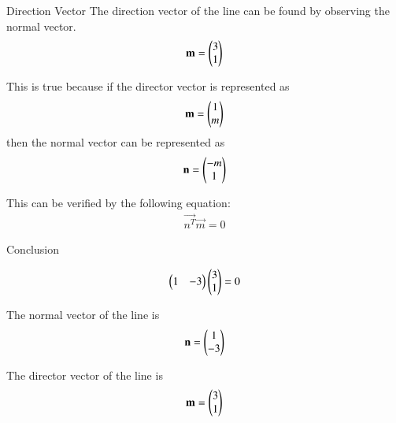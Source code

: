 \documentclass{beamer}
\begin{document}
\begin{frame}{Direction Vector}
The direction vector of the line can be found by observing the normal vector.
\begin{align}
\mathbf{m} = \begin{pmatrix}3 \\ 1\end{pmatrix}
\end{align}

This is true because if the director vector is represented as 
\begin{align}
\mathbf{m}  = \begin{pmatrix}1 \\ m\end{pmatrix}    
\end{align}
then the normal vector can be represented as 
\begin{align}
\mathbf{n} = \begin{pmatrix}-m \\ 1\end{pmatrix}
\end{align}

This can be verified by the following equation:
\begin{align}
\vec{n^T}\vec{m} = 0
\end{align}
\end{frame}
\begin{frame}{Conclusion}

\begin{align}
\begin{pmatrix}1 & -3\end{pmatrix}\begin{pmatrix}3 \\ 1\end{pmatrix} = 0
\end{align}


The normal vector of the line is 
\begin{align}
\mathbf{n} = \begin{pmatrix}1 \\ -3\end{pmatrix}
\end{align}

The director vector of the line is 
\begin{align}
\mathbf{m} = \begin{pmatrix}3 \\ 1\end{pmatrix}
\end{align}


\end{frame}
\end{document}

